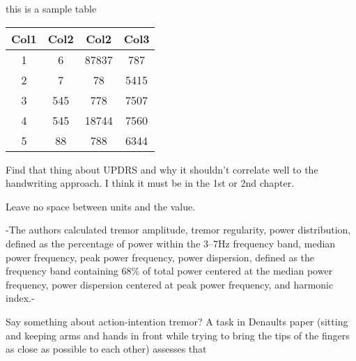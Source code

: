 
this is a sample table
\begin{center}
 \begin{tabular}{||c c c c||} 
 \hline
 Col1 & Col2 & Col2 & Col3 \\ [0.5ex] 
 \hline\hline
 1 & 6 & 87837 & 787 \\ 
 \hline
 2 & 7 & 78 & 5415 \\
 \hline
 3 & 545 & 778 & 7507 \\
 \hline
 4 & 545 & 18744 & 7560 \\
 \hline
 5 & 88 & 788 & 6344 \\ [1ex] 
 \hline
\end{tabular}
\end{center}



Find that thing about UPDRS and why it shouldn't correlate well to the handwriting approach. I think it must be in the 1st or 2nd chapter.

Leave no space between units and the value. 




-The authors calculated tremor amplitude, tremor regularity, power distribution, defined as the percentage of power within the 3–7Hz frequency band, median power frequency, peak power frequency, power dispersion, defined as the frequency band containing 68\% of total power centered at the median power frequency, power dispersion centered at peak power frequency, and harmonic index.-

Say something about action-intention tremor? A task in Denaults paper (sitting and keeping arms and hands in front while trying to bring the tips of the fingers as close as possible to each other) assesses that

